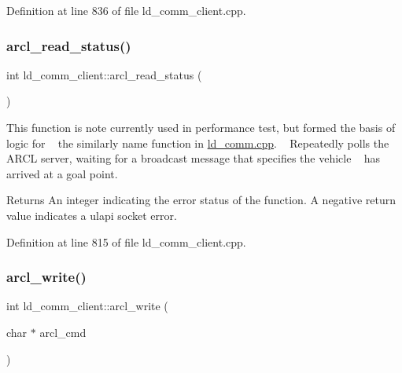 Definition at line 836 of file ld\+\_\+comm\+\_\+client.\+cpp.

\mbox{\label{classld__comm__client_aa6ff20939ad36ccbe390d1c3d9b1b242}} 
\subsubsection{\texorpdfstring{arcl\+\_\+read\+\_\+status()}{arcl\_read\_status()}}
{\footnotesize\ttfamily int ld\+\_\+comm\+\_\+client\+::arcl\+\_\+read\+\_\+status (\begin{DoxyParamCaption}{ }\end{DoxyParamCaption})}

This function is note currently used in performance test, but formed the basis of logic for ~\newline
the similarly name function in \mbox{\hyperlink{ld__comm_8cpp}{ld\+\_\+comm.\+cpp}}. ~\newline
Repeatedly polls the A\+R\+CL server, waiting for a broadcast message that specifies the vehicle ~\newline
has arrived at a goal point. \begin{DoxyReturn}{Returns}
An integer indicating the error status of the function. A negative return value indicates a ulapi socket error. 
\end{DoxyReturn}


Definition at line 815 of file ld\+\_\+comm\+\_\+client.\+cpp.

\mbox{\label{classld__comm__client_af044c54c00fe8b8f1528eb094b11ad88}} 
\subsubsection{\texorpdfstring{arcl\+\_\+write()}{arcl\_write()}}
{\footnotesize\ttfamily int ld\+\_\+comm\+\_\+client\+::arcl\+\_\+write (\begin{DoxyParamCaption}\item[{char $\ast$}]{arcl\+\_\+cmd }\end{DoxyParamCaption})}

